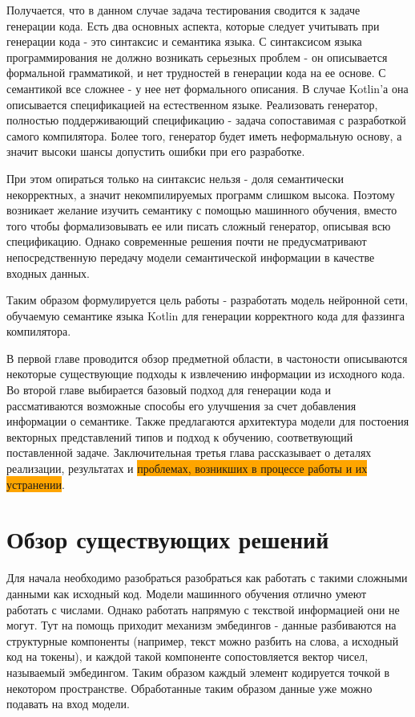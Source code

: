 \documentclass[times,specification,annotation]{itmo-student-thesis}
\begin{document}
Получается, что в данном случае задача тестирования сводится к задаче генерации кода. Есть два основных аспекта, которые следует учитывать при генерации кода - это синтаксис и семантика языка. С синтаксисом языка программирования не должно возникать серьезных проблем - он описывается формальной грамматикой, и нет трудностей в генерации кода на ее основе. С семантикой все сложнее - у нее нет формального описания. В случае Kotlin'а она описывается спецификацией на естественном языке. Реализовать генератор, полностью поддерживающий спецификацию - задача сопоставимая с разработкой самого компилятора. Более того, генератор будет иметь неформальную основу, а значит высоки шансы допустить ошибки при его разработке.

При этом опираться только на синтаксис нельзя - доля семантически некорректных, а значит некомпилируемых программ слишком высока. Поэтому возникает желание изучить семантику с помощью машинного обучения, вместо того чтобы формализовывать ее или писать сложный генератор, описывая всю спецификацию. Однако современные решения почти не предусматривают непосредственную передачу модели семантической информации в качестве входных данных.

Таким образом формулируется цель работы - разработать модель нейронной сети, обучаемую семантике языка Kotlin для генерации корректного кода для фаззинга компилятора.

В первой главе проводится обзор предметной области, в частоности описываются некоторые существующие подходы к извлечению информации из исходного кода. Во второй главе выбирается базовый подход для генерации кода и рассмативаются возможные способы его улучшения за счет добавления информации о семантике. Также предлагаются архитектура модели для постоения векторных представлений типов и подход к обучению, соответвующий поставленной задаче. Заключительная третья глава рассказывает о деталях реализации, результатах и \colorbox{orange}{проблемах, возникших в процессе работы и их устранении}.


\chapter{Обзор существующих решений}

Для начала необходимо разобраться разобраться как работать с такими сложными данными как исходный код. 
Модели машинного обучения отлично умеют работать с числами. Однако работать напрямую с текствой информацией они не могут. Тут на помощь приходит механизм эмбедингов - данные разбиваются на структурные компоненты (например, текст можно разбить на слова, а исходный код на токены), и каждой такой компоненте сопостовляется вектор чисел, называемый эмбедингом. Таким образом каждый элемент кодируется точкой в некотором пространстве. Обработанные таким образом данные уже можно подавать на вход модели.
\end{document}
